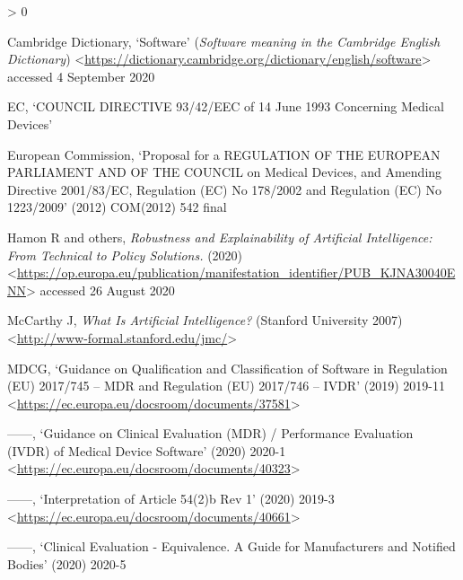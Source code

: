 \documentclass[
]{scrartcl}
\newlength{\cslhangindent}
\newenvironment{CSLReferences}[2] %
 {%
  \setlength{\parindent}{0pt}
  \ifodd #1 \everypar{\setlength{\hangindent}{\cslhangindent}}\ignorespaces\fi
  \ifnum #2 > 0
  \setlength{\parskip}{#2\baselineskip}
  \fi
 }%
 {}
\begin{document}
\hypertarget{refs}{}
\begin{CSLReferences}{0}{0}
\leavevmode\hypertarget{ref-cambridgedictionarySoftware}{}%
Cambridge Dictionary, {`Software'} (\emph{Software \textbar{} meaning in the Cambridge English Dictionary}) \textless{}\url{https://dictionary.cambridge.org/dictionary/english/software}\textgreater{} accessed 4 September 2020

\leavevmode\hypertarget{ref-ecCOUNCILDIRECTIVE931993}{}%
EC, {`{COUNCIL DIRECTIVE} 93/42/{EEC} of 14 {June} 1993 Concerning Medical Devices'}

\leavevmode\hypertarget{ref-europeancommissionProposalREGULATIONEUROPEAN2012}{}%
European Commission, {`Proposal for a {REGULATION OF THE EUROPEAN PARLIAMENT AND OF THE COUNCIL} on Medical Devices, and Amending {Directive} 2001/83/{EC}, {Regulation} ({EC}) {No} 178/2002 and {Regulation} ({EC}) {No} 1223/2009'} (2012) COM(2012) 542 final

\leavevmode\hypertarget{ref-hamonRobustnessExplainabilityArtificial2020}{}%
Hamon R and others, \emph{Robustness and Explainability of {Artificial Intelligence}: From Technical to Policy Solutions.} (2020) \textless{}\url{https://op.europa.eu/publication/manifestation_identifier/PUB_KJNA30040ENN}\textgreater{} accessed 26 August 2020

\leavevmode\hypertarget{ref-mccarthyWhatArtificialIntelligence2007b}{}%
McCarthy J, \emph{What {Is Artificial Intelligence}?} ({Stanford University} 2007) \textless{}\url{http://www-formal.stanford.edu/jmc/}\textgreater{}

\leavevmode\hypertarget{ref-mdcgGuidanceQualificationClassification2019}{}%
MDCG, {`Guidance on {Qualification} and {Classification} of {Software} in {Regulation} ({EU}) 2017/745 -- {MDR} and {Regulation} ({EU}) 2017/746 -- {IVDR}'} (2019) 2019-11 \textless{}\url{https://ec.europa.eu/docsroom/documents/37581}\textgreater{}

\leavevmode\hypertarget{ref-mdcgGuidanceClinicalEvaluation2020}{}%
------, {`Guidance on {Clinical Evaluation} ({MDR}) / {Performance Evaluation} ({IVDR}) of {Medical Device Software}'} (2020) 2020-1 \textless{}\url{https://ec.europa.eu/docsroom/documents/40323}\textgreater{}

\leavevmode\hypertarget{ref-mdcgInterpretationArticle542020}{}%
------, {`Interpretation of {Article} 54(2)b Rev 1'} (2020) 2019-3 \textless{}\url{https://ec.europa.eu/docsroom/documents/40661}\textgreater{}

\leavevmode\hypertarget{ref-mdcgClinicalEvaluationEquivalence2020}{}%
------, {`Clinical {Evaluation} - {Equivalence}. {A} Guide for Manufacturers and Notified Bodies'} (2020) 2020-5


\end{CSLReferences}
\end{document}
